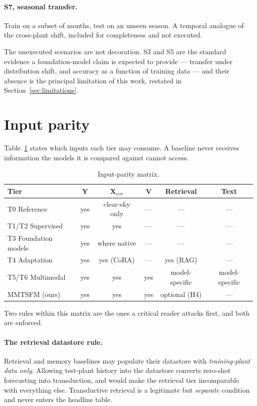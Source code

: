\paragraph{S7, seasonal transfer.} Train on a subset of months, test on an unseen season. A
temporal analogue of the cross-plant shift, included for completeness and not executed.

The unexecuted scenarios are not decoration. S3 and S5 are the standard evidence a
foundation-model claim is expected to provide --- transfer under distribution shift, and
accuracy as a function of training data --- and their absence is the principal limitation
of this work, restated in Section~\ref{sec:limitations}.

\section{Input parity}
\label{sec:parity}

Table~\ref{tab:parity} states which inputs each tier may consume. A baseline never receives
information the models it is compared against cannot access.

\begin{table}[h!]
\centering
\small
\begin{tabular}{l c c c c c}
\hline
\textbf{Tier} & $\mathbf{Y}$ & $\mathbf{X}_{\text{cov}}$ & $\mathbf{V}$ &
\textbf{Retrieval} & \textbf{Text} \\
\hline
T0 Reference & yes & clear-sky only & --- & --- & --- \\
T1/T2 Supervised & yes & yes & --- & --- & --- \\
T3 Foundation models & yes & where native & --- & --- & --- \\
T4 Adaptation & yes & yes (CoRA) & --- & yes (RAG) & --- \\
T5/T6 Multimodal & yes & yes & yes & model-specific & model-specific \\
MMTSFM (ours) & yes & yes & yes & optional (H4) & --- \\
\hline
\end{tabular}
\caption{Input-parity matrix.}
\label{tab:parity}
\end{table}

Two rules within this matrix are the ones a critical reader attacks first, and both are
enforced.

\paragraph{The retrieval datastore rule.} Retrieval and memory baselines may populate their
datastore with \emph{training-plant data only}. Allowing test-plant history into the
datastore converts zero-shot forecasting into transduction, and would make the retrieval
tier incomparable with everything else. Transductive retrieval is a legitimate but
\emph{separate} condition and never enters the headline table.

